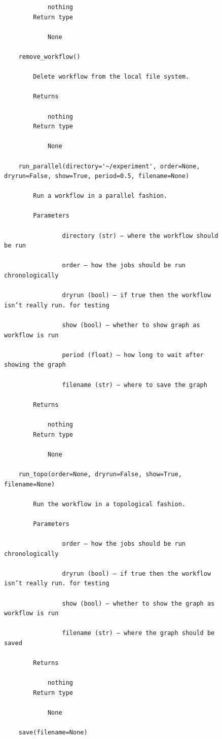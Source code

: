 \begin{figure}[htb]
\begin{verbatim}
            nothing
        Return type

            None

    remove_workflow()

        Delete workflow from the local file system.

        Returns

            nothing
        Return type

            None

    run_parallel(directory='~/experiment', order=None, dryrun=False, show=True, period=0.5, filename=None)

        Run a workflow in a parallel fashion.

        Parameters

                directory (str) – where the workflow should be run

                order – how the jobs should be run chronologically

                dryrun (bool) – if true then the workflow isn’t really run. for testing

                show (bool) – whether to show graph as workflow is run

                period (float) – how long to wait after showing the graph

                filename (str) – where to save the graph

        Returns

            nothing
        Return type

            None

    run_topo(order=None, dryrun=False, show=True, filename=None)

        Run the workflow in a topological fashion.

        Parameters

                order – how the jobs should be run chronologically

                dryrun (bool) – if true then the workflow isn’t really run. for testing

                show (bool) – whether to show the graph as workflow is run

                filename (str) – where the graph should be saved

        Returns

            nothing
        Return type

            None

    save(filename=None)


\end{verbatim}
\end{figure}
